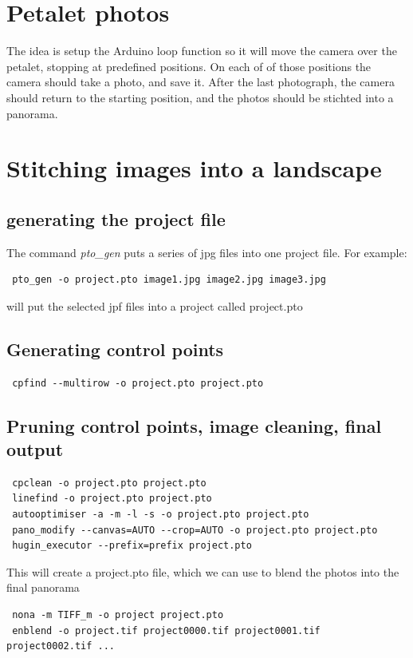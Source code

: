 \documentclass[a4paper,10pt]{article}
\begin{document}
\section{Petalet photos}

The idea is setup the Arduino loop function so it will move the camera over the petalet, stopping at predefined positions.
On each of of those positions the camera should take a photo, and save it. After the last photograph, the camera
should return to the starting position, and the photos should be stichted into a panorama.

\section{Stitching images into a landscape}

\subsection{generating the project file}

The command \textit{pto\_gen} puts a series of jpg files into one project file. For example:
\begin{verbatim}
 pto_gen -o project.pto image1.jpg image2.jpg image3.jpg
\end{verbatim}
will put the selected jpf files into a project called project.pto

\subsection{Generating control points}
\begin{verbatim}
 cpfind --multirow -o project.pto project.pto
\end{verbatim}

\subsection{Pruning control points, image cleaning, final output}
\begin{verbatim}
 cpclean -o project.pto project.pto
 linefind -o project.pto project.pto
 autooptimiser -a -m -l -s -o project.pto project.pto
 pano_modify --canvas=AUTO --crop=AUTO -o project.pto project.pto
 hugin_executor --prefix=prefix project.pto
\end{verbatim}

This will create a project.pto file, which we can use to blend the photos into the final panorama
\begin{verbatim}
 nona -m TIFF_m -o project project.pto
 enblend -o project.tif project0000.tif project0001.tif project0002.tif ...
\end{verbatim}
\end{document}

